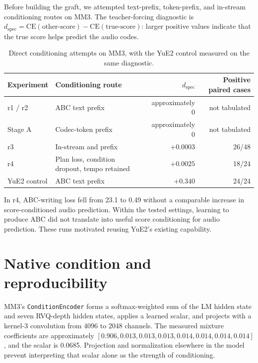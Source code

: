 \documentclass[11pt,a4paper]{article}
\newcommand{\code}[1]{\texttt{#1}}
\begin{document}
Before building the graft, we attempted text-prefix, token-prefix, and in-stream conditioning routes on MM3. The teacher-forcing diagnostic is $d_{\mathrm{spec}} = \mathrm{CE}(\text{other-score}) - \mathrm{CE}(\text{true-score})$: larger positive values indicate that the true score helps predict the audio codes.

\begin{table}[H]
    \centering
    \caption{Direct conditioning attempts on MM3, with the YuE2 control measured on the same diagnostic.}
    \label{tab:direct}
    \footnotesize
    \begin{tabular}{llrr}
        \toprule
        Experiment & Conditioning route & $d_{\mathrm{spec}}$ & Positive paired cases \\
        \midrule
        r1 / r2 & ABC text prefix & approximately 0 & not tabulated \\
        Stage A & Codec-token prefix & approximately 0 & not tabulated \\
        r3 & In-stream and prefix & $+0.0003$ & 26/48 \\
        r4 & Plan loss, condition dropout, tempo retained & $+0.0025$ & 18/24 \\
        YuE2 control & ABC text prefix & $+0.340$ & 24/24 \\
        \bottomrule
    \end{tabular}
\end{table}

In r4, ABC-writing loss fell from 23.1 to 0.49 without a comparable increase in score-conditioned audio prediction. Within the tested settings, learning to produce ABC did not translate into useful score conditioning for audio prediction. These runs motivated reusing YuE2's existing capability.

\section{Native condition and reproducibility}
\label{app:native}

MM3's \code{ConditionEncoder} forms a softmax-weighted sum of the LM hidden state and seven RVQ-depth hidden states, applies a learned scalar, and projects with a kernel-3 convolution from 4096 to 2048 channels. The measured mixture coefficients are approximately $[0.906, 0.013, 0.013, 0.013, 0.014, 0.014, 0.014, 0.014]$, and the scalar is 0.0685. Projection and normalization elsewhere in the model prevent interpreting that scalar alone as the strength of conditioning.
\end{document}
